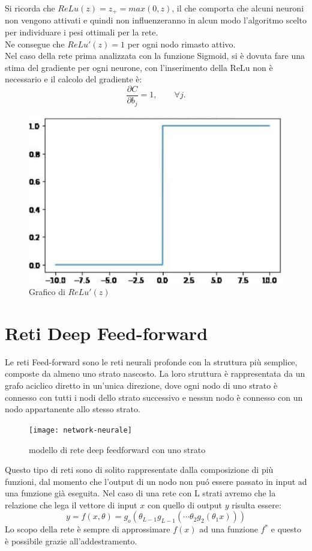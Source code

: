 \documentclass[a4paper,12pt]{report}
\begin{document}
Si ricorda che $ReLu(z)=z_{+}=max(0,z)$, il che comporta che alcuni neuroni non vengono attivati e quindi non influenzeranno in alcun modo l'algoritmo scelto per individuare i pesi ottimali per la rete.\\
Ne consegue che  $ReLu'(z)=1$ per ogni nodo rimasto attivo.\\
Nel caso della rete prima analizzata con la funzione Sigmoid, si \`e dovuta fare una stima del gradiente per ogni neurone, con l'inserimento della ReLu non \`e necessario e il calcolo del gradiente \`e:
\begin{equation}
\frac{\partial C}{\partial b_j}=1, \qquad \forall j.
\end{equation}
\begin{figure}[!h]
\centering
\caption{Grafico di $ReLu'(z)$}
\includegraphics[scale=1.8]{derivataRelu}
\end{figure}
\newpage
\section{Reti Deep Feed-forward}
Le reti Feed-forward sono le reti neurali profonde con la struttura pi\`{u} semplice, composte da almeno uno strato nascosto. La loro struttura \`e rappresentata da un grafo aciclico diretto in un'unica direzione, dove ogni nodo di uno strato \`e connesso con tutti i nodi dello strato successivo e nessun nodo \`e connesso con un nodo appartanente allo stesso strato.
\begin{figure}[!h]
\centering
\texttt{[image: network-neurale]}
\caption{modello di rete deep feedforward con uno strato}\label{rete}
\end{figure}

Questo tipo di reti sono di solito rappresentate dalla composizione di pi\`{u} funzioni, dal momento che l'output di un nodo non pu\'{o} essere passato in input ad una funzione gi\`{a} eseguita. Nel caso di una rete con L strati avremo che  la relazione che lega il vettore di input $x$ con quello di output $y$ risulta essere:
\begin{equation}
y=f(x,\theta)=g_o(\theta_{L-1}g_{L-1}(\cdots \theta_{2}g_{2}(\theta_{1}x)))
\end{equation}
Lo scopo della rete \`e sempre di approssimare $f(x)$ ad una funzione $f^*$ e questo \`e possibile grazie all'addestramento.
\newpage
\end{document}
